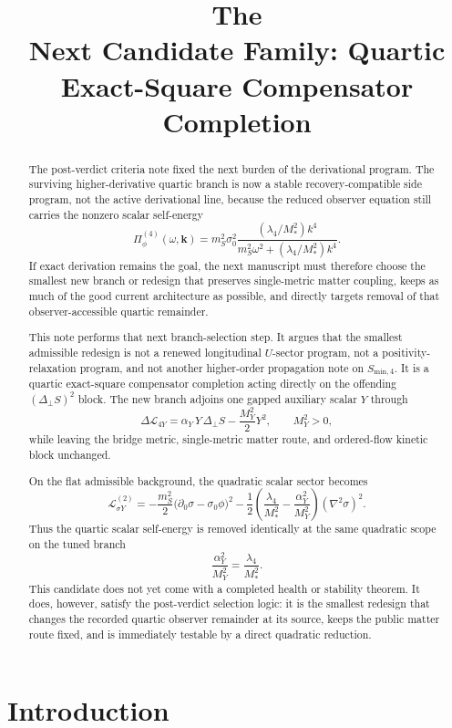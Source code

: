 \documentclass[11pt]{article}
\title{\textbf{The \TheoryName{}}\\[0.4em]
\large Next Candidate Family: Quartic Exact-Square Compensator Completion}
\author{}
\date{}
\begin{document}
\maketitle

\begin{abstract}
The post-verdict criteria note fixed the next burden of the derivational program. The surviving higher-derivative quartic branch is now a stable recovery-compatible side program, not the active derivational line, because the reduced observer equation still carries the nonzero scalar self-energy
\[
\Pi_\phi^{(4)}(\omega,\mathbf{k})
=
m_S^2\sigma_0^2
\frac{(\lambda_4/M_*^2)k^4}
{m_S^2\omega^2+(\lambda_4/M_*^2)k^4}.
\]
If exact derivation remains the goal, the next manuscript must therefore choose the smallest new branch or redesign that preserves single-metric matter coupling, keeps as much of the good current architecture as possible, and directly targets removal of that observer-accessible quartic remainder.

This note performs that next branch-selection step. It argues that the smallest admissible redesign is not a renewed longitudinal \(U\)-sector program, not a positivity-relaxation program, and not another higher-order propagation note on \(S_{\mathrm{min},4}\). It is a quartic exact-square compensator completion acting directly on the offending \((\Delta_{\perp}S)^2\) block. The new branch adjoins one gapped auxiliary scalar \(Y\) through
\[
\Delta\mathcal L_{4Y}
=
\alpha_Y\,Y\,\Delta_{\perp}S
-\frac{M_Y^2}{2}Y^2,
\qquad
M_Y^2>0,
\]
while leaving the bridge metric, single-metric matter route, and ordered-flow kinetic block unchanged.

On the flat admissible background, the quadratic scalar sector becomes
\[
\mathcal L_{\sigma Y}^{(2)}
=
-\frac{m_S^2}{2}\bigl(\partial_0\sigma-\sigma_0\phi\bigr)^2
-\frac{1}{2}
\left(
\frac{\lambda_4}{M_*^2}
-\frac{\alpha_Y^2}{M_Y^2}
\right)
(\nabla^2\sigma)^2.
\]
Thus the quartic scalar self-energy is removed identically at the same quadratic scope on the tuned branch
\[
\frac{\alpha_Y^2}{M_Y^2}
=
\frac{\lambda_4}{M_*^2}.
\]
This candidate does not yet come with a completed health or stability theorem. It does, however, satisfy the post-verdict selection logic: it is the smallest redesign that changes the recorded quartic observer remainder at its source, keeps the public matter route fixed, and is immediately testable by a direct quadratic reduction.
\end{abstract}

\section{Introduction}
\end{document}

